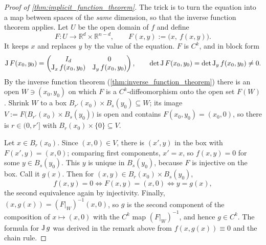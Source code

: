 
\begin{proof}[Proof of \cref{thm:implicit_function_theorem}]
The trick is to turn the equation into a map between spaces of the \emph{same} dimension, so that
the inverse function theorem applies. Let $U$ be the open domain of $f$ and define
\[F : U \to \mathbb{R}^d\times\mathbb{R}^{n-d}, \qquad F(x,y) := \big(x,\ f(x,y)\big).\]
It keeps $x$ and replaces $y$ by the value of the equation. $F$ is $C^k$, and in block form
\[\operatorname{J} F(x_0,y_0) = \begin{pmatrix} I_d & 0 \\ \operatorname{J}_xf(x_0,y_0) & \operatorname{J}_yf(x_0,y_0)\end{pmatrix},
  \qquad \det \operatorname{J} F(x_0,y_0) = \det \operatorname{J}_yf(x_0,y_0) \neq 0 .\]
By the inverse function theorem (\cref{thm:inverse_function_theorem}) there is an open
$W \ni (x_0,y_0)$ on which $F$ is a $C^k$-diffeomorphism onto the open set $F(W)$. Shrink $W$ to a
box $B_{r'}(x_0)\times B_s(y_0) \subseteq W$; its image $V := F\big(B_{r'}(x_0)\times
B_s(y_0)\big)$ is open and contains $F(x_0,y_0) = (x_0,0)$, so there is $r \in (0,r']$ with
$B_r(x_0)\times\{0\} \subseteq V$.

Let $x \in B_r(x_0)$. Since $(x,0) \in V$, there is $(x',y)$ in the box with
$F(x',y) = (x,0)$; comparing first components, $x' = x$, so $f(x,y) = 0$ for some
$y \in B_s(y_0)$. This $y$ is unique in $B_s(y_0)$, because $F$ is injective on the box. Call it
$g(x)$. Then for $(x,y) \in B_r(x_0)\times B_s(y_0)$,
\[f(x,y) = 0 \iff F(x,y) = (x,0) \iff y = g(x),\]
the second equivalence again by injectivity. Finally, $(x,g(x)) = (F|_W)^{-1}(x,0)$, so $g$ is the
second component of the composition of $x \mapsto (x,0)$ with the $C^k$ map $(F|_W)^{-1}$, and
hence $g \in C^k$. The formula for $\operatorname{J} g$ was derived in
the remark above from $f(x,g(x)) \equiv 0$ and the chain rule.
\end{proof}

